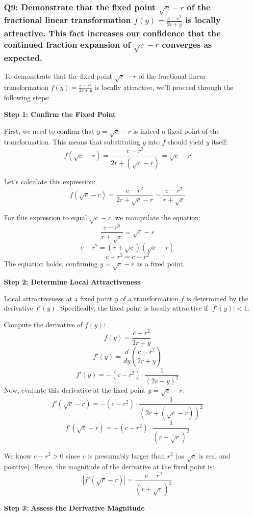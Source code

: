 \documentclass[8pt]{article}
\begin{document}
\subsubsection*{Q9: Demonstrate that the fixed point \( \sqrt{c} - r \) of the fractional linear transformation \( f(y) = \frac{c - r^2}{2r + y} \) is locally attractive. This fact increases our confidence that the continued fraction expansion of \( \sqrt{c} - r \) converges as expected.}

To demonstrate that the fixed point \(\sqrt{c} - r\) of the fractional linear transformation \(f(y) = \frac{c - r^2}{2r + y}\) is locally attractive, we'll proceed through the following steps:

\textbf{Step 1: Confirm the Fixed Point}

First, we need to confirm that \(y = \sqrt{c} - r\) is indeed a fixed point of the transformation. This means that substituting \(y\) into \(f\) should yield \(y\) itself:
\[ f(\sqrt{c} - r) = \frac{c - r^2}{2r + (\sqrt{c} - r)} = \sqrt{c} - r \]

Let's calculate this expression:
\[ f(\sqrt{c} - r) = \frac{c - r^2}{2r + \sqrt{c} - r} = \frac{c - r^2}{r + \sqrt{c}} \]

For this expression to equal \(\sqrt{c} - r\), we manipulate the equation:
\[ \frac{c - r^2}{r + \sqrt{c}} = \sqrt{c} - r \]
\[ c - r^2 = (r + \sqrt{c})(\sqrt{c} - r) \]
\[ c - r^2 = c - r^2 \]
The equation holds, confirming \(y = \sqrt{c} - r\) as a fixed point.

\textbf{Step 2: Determine Local Attractiveness}

Local attractiveness at a fixed point \(y\) of a transformation \(f\) is determined by the derivative \(f'(y)\). Specifically, the fixed point is locally attractive if \(|f'(y)| < 1\).

Compute the derivative of \(f(y)\):
\[ f(y) = \frac{c - r^2}{2r + y} \]
\[ f'(y) = \frac{d}{dy}\left(\frac{c - r^2}{2r + y}\right) \]
\[ f'(y) = -(c - r^2) \cdot \frac{1}{(2r + y)^2} \]
Now, evaluate this derivative at the fixed point \(y = \sqrt{c} - r\):
\[ f'(\sqrt{c} - r) = -(c - r^2) \cdot \frac{1}{(2r + (\sqrt{c} - r))^2} \]
\[ f'(\sqrt{c} - r) = -(c - r^2) \cdot \frac{1}{(r + \sqrt{c})^2} \]

We know \(c - r^2 > 0\) since \(c\) is presumably larger than \(r^2\) (as \(\sqrt{c}\) is real and positive). Hence, the magnitude of the derivative at the fixed point is:
\[ |f'(\sqrt{c} - r)| = \frac{c - r^2}{(r + \sqrt{c})^2} \]

\textbf{Step 3: Assess the Derivative Magnitude}
\end{document}

